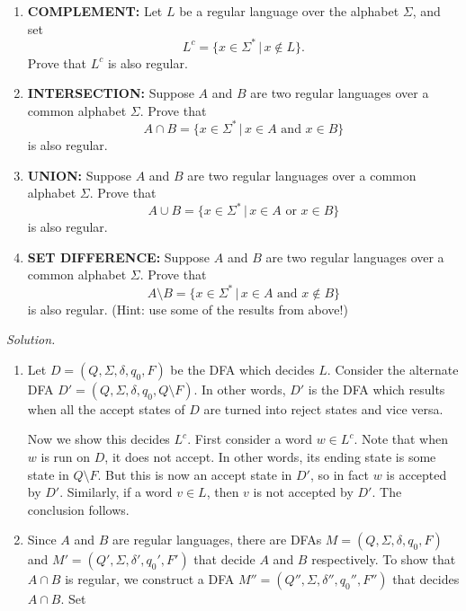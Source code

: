 \documentclass[11pt]{article}
\newcounter{enum}
\newcommand{\solution}
{
\vspace{5pt}
\noindent\textit{Solution.}\qquad
}
\begin{document}
\begin{enumerate}
\begin{enumerate}

\item \textbf{COMPLEMENT:} Let $L$ be a regular language over the alphabet $\Sigma$, and set \[L^c = \{x\in\Sigma^*\,|\, x\not\in L\}.\] Prove that $L^c$ is also regular.

\item \textbf{INTERSECTION:} Suppose $A$ and $B$ are two regular languages over a common alphabet $\Sigma$.  Prove that \[A\cap B = \{x\in\Sigma^*\,|\,x\in A\text{ and }x\in B\}\] is also regular.

\item \textbf{UNION:} Suppose $A$ and $B$ are two regular languages over a common alphabet $\Sigma$.  Prove that \[A\cup B = \{x\in\Sigma^*\,|\,x\in A\text{ or }x\in B\}\] is also regular.

\item\textbf{SET DIFFERENCE:} Suppose $A$ and $B$ are two regular languages over a common alphabet $\Sigma$.  Prove that \[A\setminus B = \{x\in\Sigma^*\,|\,x\in A\text{ and }x\not\in B\}\] is also regular.  (Hint: use some of the results from above!)
\end{enumerate}

\solution

\begin{enumerate}

\item Let $D = (Q,\Sigma,\delta, q_0, F)$ be the DFA which decides $L$.  Consider the alternate DFA $D'=(Q,\Sigma,\delta, q_0, Q\setminus F)$.  In other words, $D'$ is the DFA which results when all the accept states of $D$ are turned into reject states and vice versa.

\par Now we show this decides $L^c$.  First consider a word $w\in L^c$.  Note that when $w$ is run on $D$, it does not accept.  In other words, its ending state is some state in $Q\setminus F$.  But this is now an accept state in $D'$, so in fact $w$ is accepted by $D'$.  Similarly, if a word $v\in L$, then $v$ is not accepted by $D'$.  The conclusion follows.

\item Since $A$ and $B$ are regular languages, there are DFAs $M=(Q,\Sigma,\delta,q_0,F)$ and $M'=(Q',\Sigma,\delta',q_0',F')$ that decide $A$ and $B$ respectively.  To show that $A\cap B$ is regular, we construct a DFA $M''=(Q'',\Sigma,\delta'',q_0'',F'')$ that decides $A\cap B$.  Set


\end{enumerate}
\end{enumerate}
\end{document}
